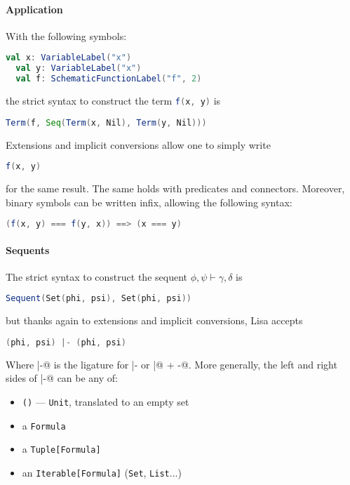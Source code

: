 \paragraph{Application}
With the following symbols:
\begin{lstlisting}[language=Scala]
  val x: VariableLabel("x")
  val y: VariableLabel("x")
  val f: SchematicFunctionLabel("f", 2)
\end{lstlisting}
the strict syntax to construct the term \lstinline[language=Scala]|f(x, y)| is
\begin{lstlisting}[language=Scala]
  Term(f, Seq(Term(x, Nil), Term(y, Nil)))
\end{lstlisting}
Extensions and implicit conversions allow one to simply write
\begin{lstlisting}[language=Scala]
  f(x, y)
\end{lstlisting}
for the same result. The same holds with predicates and connectors. Moreover, binary symbols can be written infix, allowing the following syntax:

\begin{lstlisting}[language=Scala]
  (f(x, y) === f(y, x)) ==> (x === y)
\end{lstlisting}

\paragraph{Sequents}
The strict syntax to construct the sequent $\phi, \psi \vdash \gamma, \delta$ is
\begin{lstlisting}[language=Scala]
  Sequent(Set(phi, psi), Set(phi, psi))
\end{lstlisting}
but thanks again to  extensions and implicit conversions, Lisa accepts
\begin{lstlisting}[language=Scala]
  (phi, psi) |- (phi, psi)
\end{lstlisting}
Where \lstinline@|-@ is the ligature for { |- } or \lstinline@|@ + \lstinline@-@. More generally, the left and right sides of \lstinline@|-@ can be any of:
\vspace*{-0.7em}
\begin{itemize}
    \setlength\itemsep{-0.5em}
  \item \lstinline|()| --- \lstinline|Unit|, translated to an empty set
  \item a \lstinline|Formula|
  \item a \lstinline|Tuple[Formula]|
  \item an \lstinline|Iterable[Formula]| (\lstinline|Set|, \lstinline|List|...)
\end{itemize}
